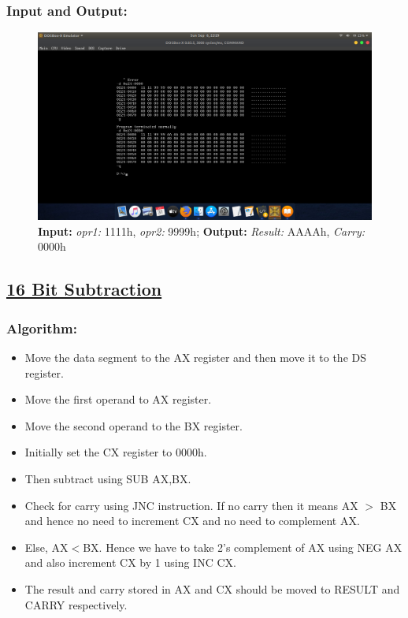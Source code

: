 \documentclass[12pt,a4paper]{article}
\begin{document}
\begin{flushleft}
\subsubsection*{\textbf{Input and Output:}}
\begin{figure}[h]
    \centering
    \includegraphics[trim = 100mm 75mm 100mm 70mm, clip, width = \textwidth]{Pics/AdditionIO.png}
    \caption{ \textbf{Input:} \emph{opr1:} 1111h, \emph{opr2:} 9999h; 
              \textbf{Output:} \emph{Result:} AAAAh, \emph{Carry:} 0000h}
\end{figure}
\newpage
\subsection*{\textbf{\underline{16 Bit Subtraction}}}

\subsubsection*{\textbf{Algorithm:}}
\begin{itemize}
    \item Move the data segment to the AX register and then move it to the DS register.
    \item Move the first operand to AX register. 
    \item Move the second operand to the BX register. 
    \item Initially set the CX register to 0000h. 
    \item Then subtract using SUB AX,BX.
    \item Check for carry using JNC instruction. If no carry then it means AX $>$ BX and hence no need to increment CX and no need to complement AX.
\item Else, AX$<$BX. Hence we have to take 2’s complement of AX using NEG AX and also increment CX by 1 using INC CX.
\item The result and carry stored in AX and CX should be moved to RESULT and CARRY respectively.
\end{itemize}


\end{flushleft}
\end{document}
